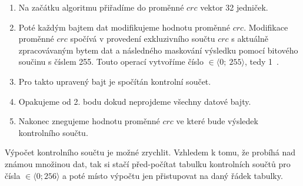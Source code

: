 

\begin{enumerate}
    \item Na začátku algoritmu přiřadíme do proměnné $crc$ vektor 32 jedniček.
    \item Poté každým bajtem dat modifikujeme hodnotu proměnné $crc$. Modifikace proměnné $crc$ spočívá v provedení exkluzivního součtu $crc$ s aktuálně zpracovávaným bytem dat a následného maskování výsledku pomocí bitového součinu s číslem 255. Touto operací vytvoříme číslo $\in \langle 0;~255 \rangle$, tedy 1~.
    \item Pro takto upravený bajt je spočítán kontrolní součet.
    \item Opakujeme od 2. bodu dokud neprojdeme všechny datové bajty.
    \item Nakonec znegujeme hodnotu proměnné $crc$ ve které bude výsledek kontrolního součtu.
\end{enumerate}


Výpočet kontrolního součtu je možné zrychlit. Vzhledem k tomu, že probíhá nad známou množinou dat, tak si stačí před-počítat tabulku kontrolních součtů pro čísla $\in \langle 0; 256 \rangle$ a poté místo výpočtu jen přistupovat na daný řádek tabulky.
